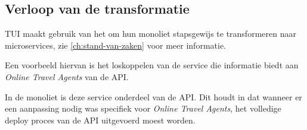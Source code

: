 \subsection{Verloop van de transformatie}

TUI maakt gebruik van het  om hun monoliet stapsgewijs te transformeren naar microservices, zie \ref{ch:stand-van-zaken} voor meer informatie.

Een voorbeeld hiervan is het loskoppelen van de service die informatie biedt aan \emph{Online Travel Agents} van de API.

In de monoliet is deze service onderdeel van de API. Dit houdt in dat wanneer er een aanpassing nodig was specifiek voor \emph{Online Travel Agents}, het volledige deploy proces van de API uitgevoerd moest worden.





